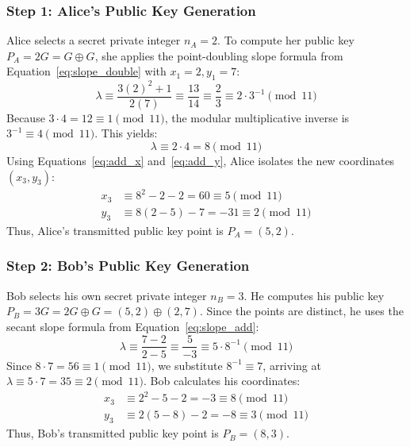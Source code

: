 \documentclass[11pt,a4paper]{article}
\begin{document}
\subsubsection{Step 1: Alice's Public Key Generation}
Alice selects a secret private integer $n_A = 2$. To compute her public key $P_A = 2G = G \oplus G$, she applies the point-doubling slope formula from Equation~\ref{eq:slope_double} with $x_1 = 2, y_1 = 7$:
\begin{equation}
    \lambda \equiv \frac{3(2)^2 + 1}{2(7)} \equiv \frac{13}{14} \equiv \frac{2}{3} \equiv 2 \cdot 3^{-1} \pmod{11}
\end{equation}
Because $3 \cdot 4 = 12 \equiv 1 \pmod{11}$, the modular multiplicative inverse is $3^{-1} \equiv 4 \pmod{11}$. This yields:
\begin{equation}
    \lambda \equiv 2 \cdot 4 = 8 \pmod{11}
\end{equation}
Using Equations~\ref{eq:add_x} and~\ref{eq:add_y}, Alice isolates the new coordinates $(x_3, y_3)$:
\begin{align}
    x_3 &\equiv 8^2 - 2 - 2 = 60 \equiv 5 \pmod{11} \\
    y_3 &\equiv 8(2 - 5) - 7 = -31 \equiv 2 \pmod{11}
\end{align}
Thus, Alice's transmitted public key point is $P_A = (5, 2)$.

\subsubsection{Step 2: Bob's Public Key Generation}
Bob selects his own secret private integer $n_B = 3$. He computes his public key $P_B = 3G = 2G \oplus G = (5,2) \oplus (2,7)$. Since the points are distinct, he uses the secant slope formula from Equation~\ref{eq:slope_add}:
\begin{equation}
    \lambda \equiv \frac{7 - 2}{2 - 5} \equiv \frac{5}{-3} \equiv 5 \cdot 8^{-1} \pmod{11}
\end{equation}
Since $8 \cdot 7 = 56 \equiv 1 \pmod{11}$, we substitute $8^{-1} \equiv 7$, arriving at $\lambda \equiv 5 \cdot 7 = 35 \equiv 2 \pmod{11}$. Bob calculates his coordinates:
\begin{align}
    x_3 &\equiv 2^2 - 5 - 2 = -3 \equiv 8 \pmod{11} \\
    y_3 &\equiv 2(5 - 8) - 2 = -8 \equiv 3 \pmod{11}
\end{align}
Thus, Bob's transmitted public key point is $P_B = (8, 3)$.
\end{document}
